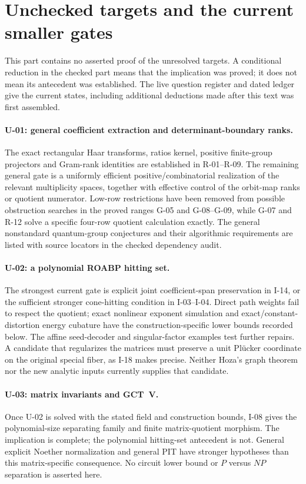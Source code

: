 \section{Unchecked targets and the current smaller gates}

This part contains no asserted proof of the unresolved targets. A conditional reduction in the checked part means that the implication was proved; it does not mean its antecedent was established. The live question register and dated ledger give the current states, including additional deductions made after this text was first assembled.

\paragraph{U-01: general coefficient extraction and determinant-boundary ranks.}
The exact rectangular Haar transforms, ratios kernel, positive finite-group projectors and Gram-rank identities are established in R-01--R-09. The remaining general gate is a uniformly efficient positive/combinatorial realization of the relevant multiplicity spaces, together with effective control of the orbit-map ranks or quotient numerator. Low-row restrictions have been removed from possible obstruction searches in the proved ranges G-05 and G-08--G-09, while G-07 and R-12 solve a specific four-row quotient calculation exactly. The general nonstandard quantum-group conjectures and their algorithmic requirements are listed with source locators in the checked dependency audit.

\paragraph{U-02: a polynomial ROABP hitting set.}
The strongest current gate is explicit joint coefficient-span preservation in I-14, or the sufficient stronger cone-hitting condition in I-03--I-04. Direct path weights fail to respect the quotient; exact nonlinear exponent simulation and exact/constant-distortion energy cubature have the construction-specific lower bounds recorded below. The affine seed-decoder and singular-factor examples test further repairs. A candidate that regularizes the matrices must preserve a unit Pl\"ucker coordinate on the original special fiber, as I-18 makes precise. Neither Hoza's graph theorem nor the new analytic inputs currently supplies that candidate.

\paragraph{U-03: matrix invariants and GCT~V.}
Once U-02 is solved with the stated field and construction bounds, I-08 gives the polynomial-size separating family and finite matrix-quotient morphism. The implication is complete; the polynomial hitting-set antecedent is not. General explicit Noether normalization and general PIT have stronger hypotheses than this matrix-specific consequence. No circuit lower bound or $P$ versus $NP$ separation is asserted here.

